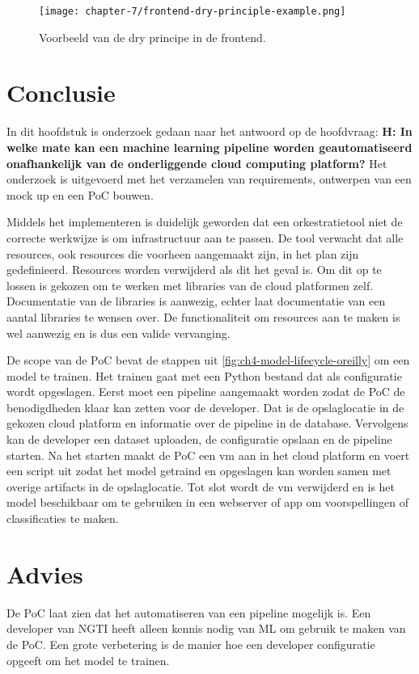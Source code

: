 \begin{figure}[hbt!]
  \centering
  \texttt{[image: chapter-7/frontend-dry-principle-example.png]}
  \caption{Voorbeeld van de \acrfull{dry} principe in de frontend.}
  \label{fig:ch7-frontend-dry-principle-example}
\end{figure}


\section{Conclusie}\label{sec:ch7-conclusie}
In dit hoofdstuk is onderzoek gedaan naar het antwoord op de hoofdvraag: \textbf{H: In welke mate kan een machine learning pipeline worden geautomatiseerd onafhankelijk van de onderliggende cloud computing platform?} Het onderzoek is uitgevoerd met het verzamelen van requirements, ontwerpen van een mock up en een PoC bouwen.

Middels het implementeren is duidelijk geworden dat een orkestratietool niet de correcte werkwijze is om infrastructuur aan te passen. De tool verwacht dat alle resources, ook resources die voorheen aangemaakt zijn, in het plan zijn gedefinieerd. Resources worden verwijderd als dit het geval is. Om dit op te lossen is gekozen om te werken met libraries van de cloud platformen zelf. Documentatie van de libraries is aanwezig, echter laat documentatie van een aantal libraries te wensen over. De functionaliteit om resources aan te maken is wel aanwezig en is dus een valide vervanging.

De scope van de PoC bevat de stappen uit \autoref{fig:ch4-model-lifecycle-oreilly} om een model te trainen. Het trainen gaat met een Python bestand dat als configuratie wordt opgeslagen. Eerst moet een pipeline aangemaakt worden zodat de PoC de benodigdheden klaar kan zetten voor de developer. Dat is de opslaglocatie in de gekozen cloud platform en informatie over de pipeline in de database. Vervolgens kan de developer een dataset uploaden, de configuratie opslaan en de pipeline starten. Na het starten maakt de PoC een \acrshort{vm} aan in het cloud platform en voert een script uit zodat het model getraind en opgeslagen kan worden samen met overige \glspl{artifact} in de opslaglocatie. Tot slot wordt de \acrshort{vm} verwijderd en is het model beschikbaar om te gebruiken in een webserver of app om voorspellingen of classificaties te maken.

\section{Advies}\label{sec:ch7-advies}
De PoC laat zien dat het automatiseren van een pipeline mogelijk is. Een developer van NGTI heeft alleen kennis nodig van ML om gebruik te maken van de PoC. Een grote verbetering is de manier hoe een developer configuratie opgeeft om het model te trainen.

